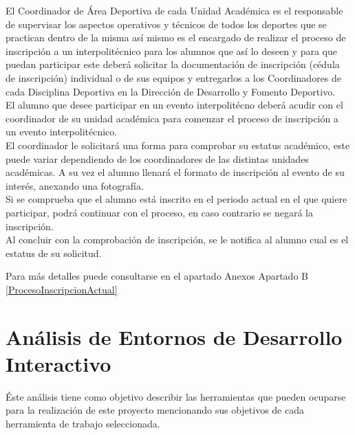 	\noindent El Coordinador de Área Deportiva de cada Unidad Académica es el responsable de supervisar los aspectos operativos y técnicos de todos los deportes que se practican dentro de la misma así mismo es el encargado de realizar el proceso de inscripción a un interpolitécnico para los alumnos que así lo deseen y para que puedan participar este deberá solicitar la documentación de inscripción (cédula de inscripción) individual o de sus equipos y entregarlos a los Coordinadores de cada Disciplina Deportiva en la Dirección de Desarrollo y Fomento Deportivo. \cite{Reglamento} \\
	\noindent  El alumno que desee participar en un evento interpolitécno deberá acudir con el coordinador de su unidad académica para comenzar el proceso de inscripción a un evento interpolitécnico. 
	\\El coordinador le solicitará una forma para comprobar su estatus académico, este puede variar dependiendo de los coordinadores de las distintas unidades académicas. A su vez el alumno llenará el formato de inscripción al evento de su interés, anexando una fotografía. 
	\\ Si se comprueba que el alumno está inscrito en el periodo actual en el que quiere participar, podrá continuar con el proceso, en caso contrario se negará la inscripción. \cite{Reglamento}
	\\ Al concluir con la comprobación de inscripción, se le notifica al alumno cual es el estatus de su solicitud. 
	
	\noindent Para más detalles puede consultarse en el apartado Anexos Apartado B \ref{ProcesoInscripcionActual}
	
	
	
	\section{An\'alisis de Entornos de Desarrollo Interactivo}
	Éste análisis tiene como objetivo describir las herramientas que pueden ocuparse para la realización de este proyecto mencionando sus objetivos de cada herramienta de trabajo seleccionada.
	

